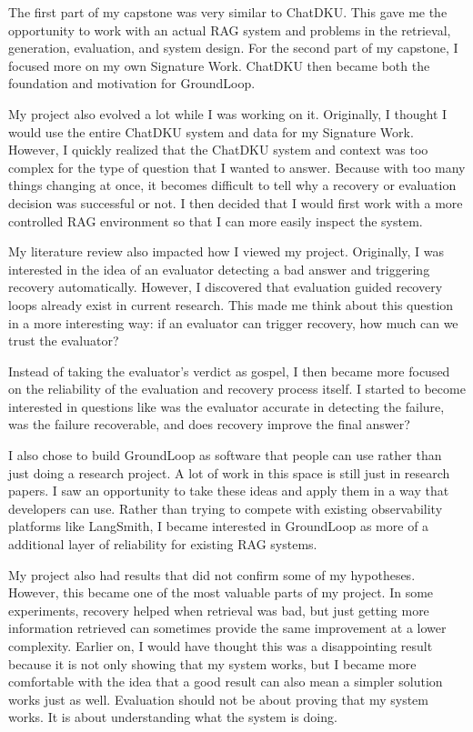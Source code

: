 \documentclass[12pt, a4paper, oneside]{report}
\begin{document}
The first part of my capstone was very similar to ChatDKU. This gave me the opportunity to work with an actual RAG system and problems in the retrieval, generation, evaluation, and system design. For the second part of my capstone, I focused more on my own Signature Work. ChatDKU then became both the foundation and motivation for GroundLoop.

My project also evolved a lot while I was working on it. Originally, I thought I would use the entire ChatDKU system and data for my Signature Work. However, I quickly realized that the ChatDKU system and context was too complex for the type of question that I wanted to answer. Because with too many things changing at once, it becomes difficult to tell why a recovery or evaluation decision was successful or not. I then decided that I would first work with a more controlled RAG environment so that I can more easily inspect the system.

My literature review also impacted how I viewed my project. Originally, I was interested in the idea of an evaluator detecting a bad answer and triggering recovery automatically. However, I discovered that evaluation guided recovery loops already exist in current research. This made me think about this question in a more interesting way: if an evaluator can trigger recovery, how much can we trust the evaluator?

Instead of taking the evaluator's verdict as gospel, I then became more focused on the reliability of the evaluation and recovery process itself. I started to become interested in questions like was the evaluator accurate in detecting the failure, was the failure recoverable, and does recovery improve the final answer?

I also chose to build GroundLoop as software that people can use rather than just doing a research project. A lot of work in this space is still just in research papers. I saw an opportunity to take these ideas and apply them in a way that developers can use. Rather than trying to compete with existing observability platforms like LangSmith, I became interested in GroundLoop as more of a additional layer of reliability for existing RAG systems.

My project also had results that did not confirm some of my hypotheses. However, this became one of the most valuable parts of my project. In some experiments, recovery helped when retrieval was bad, but just getting more information retrieved can sometimes provide the same improvement at a lower complexity. Earlier on, I would have thought this was a disappointing result because it is not only showing that my system works, but I became more comfortable with the idea that a good result can also mean a simpler solution works just as well. Evaluation should not be about proving that my system works. It is about understanding what the system is doing.
\end{document}
